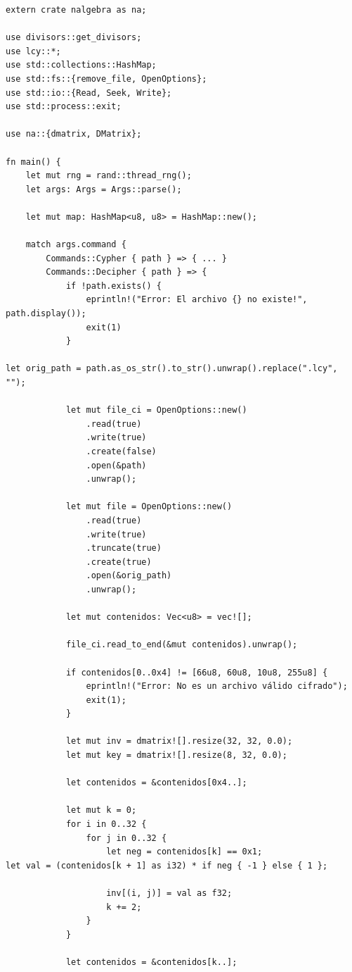 \documentclass[a4paper]{article}
\begin{document}
\begin{verbatim}
extern crate nalgebra as na;

use divisors::get_divisors;
use lcy::*;
use std::collections::HashMap;
use std::fs::{remove_file, OpenOptions};
use std::io::{Read, Seek, Write};
use std::process::exit;

use na::{dmatrix, DMatrix};

fn main() {
    let mut rng = rand::thread_rng();
    let args: Args = Args::parse();

    let mut map: HashMap<u8, u8> = HashMap::new();

    match args.command {
        Commands::Cypher { path } => { ... }
        Commands::Decipher { path } => {
            if !path.exists() {
                eprintln!("Error: El archivo {} no existe!", path.display());
                exit(1)
            }

let orig_path = path.as_os_str().to_str().unwrap().replace(".lcy", "");

            let mut file_ci = OpenOptions::new()
                .read(true)
                .write(true)
                .create(false)
                .open(&path)
                .unwrap();

            let mut file = OpenOptions::new()
                .read(true)
                .write(true)
                .truncate(true)
                .create(true)
                .open(&orig_path)
                .unwrap();

            let mut contenidos: Vec<u8> = vec![];

            file_ci.read_to_end(&mut contenidos).unwrap();

            if contenidos[0..0x4] != [66u8, 60u8, 10u8, 255u8] {
                eprintln!("Error: No es un archivo válido cifrado");
                exit(1);
            }

            let mut inv = dmatrix![].resize(32, 32, 0.0);
            let mut key = dmatrix![].resize(8, 32, 0.0);

            let contenidos = &contenidos[0x4..];

            let mut k = 0;
            for i in 0..32 {
                for j in 0..32 {
                    let neg = contenidos[k] == 0x1;
let val = (contenidos[k + 1] as i32) * if neg { -1 } else { 1 };

                    inv[(i, j)] = val as f32;
                    k += 2;
                }
            }

            let contenidos = &contenidos[k..];


\end{verbatim}
\end{document}
